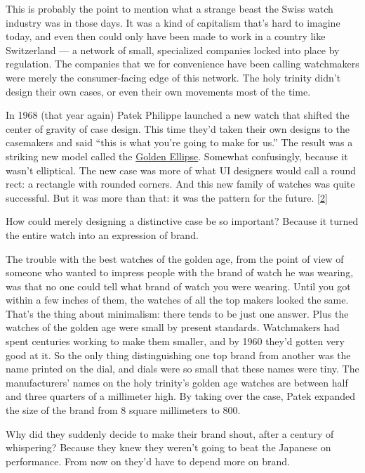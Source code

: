 This is probably the point to mention what a strange beast the Swiss
watch industry was in those days. It was a kind of capitalism that's
hard to imagine today, and even then could only have been made to work
in a country like Switzerland --- a network of small, specialized
companies locked into place by regulation. The companies that we for
convenience have been calling watchmakers were merely the
consumer-facing edge of this network. The holy trinity didn't design
their own cases, or even their own movements most of the time.

In 1968 (that year again) Patek Philippe launched a new watch that
shifted the center of gravity of case design. This time they'd taken
their own designs to the casemakers and said ``this is what you're going
to make for us.'' The result was a striking new model called the
\href{https://collectability.com/learn/the-history-of-the-golden-ellipse/}{Golden
Ellipse}. Somewhat confusingly, because it wasn't elliptical. The new
case was more of what UI designers would call a round rect: a rectangle
with rounded corners. And this new family of watches was quite
successful. But it was more than that: it was the pattern for the
future. {[}\hyperref[f2n]{2}{]}

How could merely designing a distinctive case be so important? Because
it turned the entire watch into an expression of brand.

The trouble with the best watches of the golden age, from the point of
view of someone who wanted to impress people with the brand of watch he
was wearing, was that no one could tell what brand of watch you were
wearing. Until you got within a few inches of them, the watches of all
the top makers looked the same. That's the thing about minimalism: there
tends to be just one answer. Plus the watches of the golden age were
small by present standards. Watchmakers had spent centuries working to
make them smaller, and by 1960 they'd gotten very good at it. So the
only thing distinguishing one top brand from another was the name
printed on the dial, and dials were so small that these names were tiny.
The manufacturers' names on the holy trinity's golden age watches are
between half and three quarters of a millimeter high. By taking over the
case, Patek expanded the size of the brand from 8 square millimeters to
800.

Why did they suddenly decide to make their brand shout, after a century
of whispering? Because they knew they weren't going to beat the Japanese
on performance. From now on they'd have to depend more on brand.


